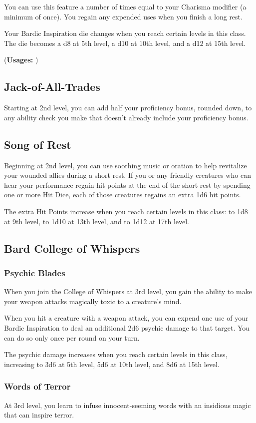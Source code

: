 \documentclass[letterpaper,openany,oneside,twocolumn]{book}
\begin{document}
You can use this feature a number of times equal to your Charisma modifier (a minimum of once). You regain any expended uses when you finish a long rest.

Your Bardic Inspiration die changes when you reach certain levels in this class. The die becomes a d8 at 5th level, a d10 at 10th level, and a d12 at 15th level.

(\textbf{Usages: })
\subsection*{Jack-of-All-Trades}
Starting at 2nd level, you can add half your proficiency bonus, rounded down, to any ability check you make that doesn't already include your proficiency bonus.
\subsection*{Song of Rest}
Beginning at 2nd level, you can use soothing music or oration to help revitalize your wounded allies during a short rest. If you or any friendly creatures who can hear your performance regain hit points at the end of the short rest by spending one or more Hit Dice, each of those creatures regains an extra 1d6 hit points.

The extra Hit Points increase when you reach certain levels in this class: to 1d8 at 9th level, to 1d10 at 13th level, and to 1d12 at 17th level.
\subsection*{Bard College of Whispers}
\subsubsection*{Psychic Blades}
When you join the College of Whispers at 3rd level, you gain the ability to make your weapon attacks magically toxic to a creature's mind.

When you hit a creature with a weapon attack, you can expend one use of your Bardic Inspiration to deal an additional 2d6 psychic damage to that target. You can do so only once per round on your turn.

The psychic damage increases when you reach certain levels in this class, increasing to 3d6 at 5th level, 5d6 at 10th level, and 8d6 at 15th level.

\subsubsection*{Words of Terror}
At 3rd level, you learn to infuse innocent-seeming words with an insidious magic that can inspire terror.
\end{document}
